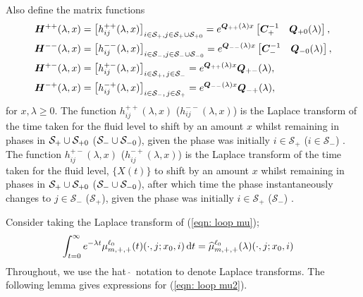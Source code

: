 Also define the matrix functions
\begin{align}
	\boldsymbol H^{++}(\lambda,x)&= \left[h_{ij}^{++}(\lambda,x)\right]_{i\in \mathcal S_+,j\in\mathcal S_{+}\cup\mathcal{S}_{+0}} = e^{\boldsymbol{Q}_{++}(\lambda)x}\begin{bmatrix} \boldsymbol C_+^{-1} & \boldsymbol Q_{+0}(\lambda) \end{bmatrix},  \label{eqn: lst 1}
	\\\boldsymbol H^{--}(\lambda,x) &= \left[h_{ij}^{--}(\lambda,x)\right]_{i\in\mathcal S_-,j\in\mathcal S_{-}\cup\mathcal{S}_{-0}}= e^{\boldsymbol{Q}_{--}(\lambda)x}\begin{bmatrix} \boldsymbol C_-^{-1} & \boldsymbol Q_{-0}(\lambda) \end{bmatrix},\label{eqn: lst 2}
	\\\boldsymbol H^{+-}(\lambda,x)  &= \left[h_{ij}^{+-}(\lambda,x)\right]_{i\in\mathcal S_+,\,j\in\mathcal S_-}= e^{\boldsymbol{Q}_{++}(\lambda)x}\boldsymbol{Q}_{+-}(\lambda), \label{eqn: lst 3}
	\\\boldsymbol H^{-+}(\lambda,x)&= \left[h_{ij}^{-+}(\lambda,x)\right]_{i\in\mathcal S_-,\, j\in\mathcal S_+} = e^{\boldsymbol{Q}_{--}(\lambda)x}\boldsymbol{Q}_{-+}(\lambda) , \label{eqn: lst 4}
\end{align}
for \(x,\lambda\geq 0\). The function \(h_{ij}^{++}(\lambda,x)\) (\(h_{ij}^{--}(\lambda,x)\)) is the Laplace transform of the time taken for the fluid level to shift by an amount \(x\) whilst remaining in phases in \(\mathcal S_+\cup\mathcal{S}_{+0}\) (\(\mathcal S_-\cup\mathcal{S}_{-0}\)), given the phase was initially \(i\in\mathcal S_+\) (\(i\in\mathcal S_-\)) \citep{bean2005}. The function \(h_{ij}^{+-}(\lambda,x)\) (\(h_{ij}^{-+}(\lambda,x)\)) is the Laplace transform of the time taken for the fluid level, \(\{X(t)\}\) to shift by an amount \(x\) whilst remaining in phases in \(\mathcal S_+\cup\mathcal{S}_{+0}\) (\(\mathcal S_-\cup\mathcal{S}_{-0}\)), after which time the phase instantaneously changes to \(j\in\mathcal S_-\) (\(\mathcal S_+\)), given the phase was initially \(i\in\mathcal S_+\) (\(\mathcal S_-\)) \citep{bean2005}.

Consider taking the Laplace transform of (\ref{eqn: loop mu});
\begin{align}
	\int_{t=0}^\infty e^{-\lambda t} \mu^{\ell_0}_{m,+,+}(t)(\cdot, j; x_0,i)  \, \mathrm{d} t  
	&= \widehat \mu^{\ell_0}_{m,+,+}(\lambda)( \cdot, j; x_0,i)    \label{eqn: loop mu2}
\end{align}
Throughout, we use the hat \(\,\widehat{}\,\)  notation to denote Laplace transforms. The following lemma gives expressions for (\ref{eqn: loop mu2}).

